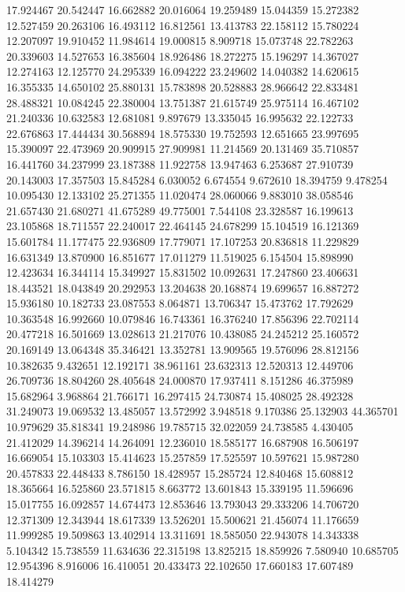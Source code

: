 17.924467
20.542447
16.662882
20.016064
19.259489
15.044359
15.272382
12.527459
20.263106
16.493112
16.812561
13.413783
22.158112
15.780224
12.207097
19.910452
11.984614
19.000815
8.909718
15.073748
22.782263
20.339603
14.527653
16.385604
18.926486
18.272275
15.196297
14.367027
12.274163
12.125770
24.295339
16.094222
23.249602
14.040382
14.620615
16.355335
14.650102
25.880131
15.783898
20.528883
28.966642
22.833481
28.488321
10.084245
22.380004
13.751387
21.615749
25.975114
16.467102
21.240336
10.632583
12.681081
9.897679
13.335045
16.995632
22.122733
22.676863
17.444434
30.568894
18.575330
19.752593
12.651665
23.997695
15.390097
22.473969
20.909915
27.909981
11.214569
20.131469
35.710857
16.441760
34.237999
23.187388
11.922758
13.947463
6.253687
27.910739
20.143003
17.357503
15.845284
6.030052
6.674554
9.672610
18.394759
9.478254
10.095430
12.133102
25.271355
11.020474
28.060066
9.883010
38.058546
21.657430
21.680271
41.675289
49.775001
7.544108
23.328587
16.199613
23.105868
18.711557
22.240017
22.464145
24.678299
15.104519
16.121369
15.601784
11.177475
22.936809
17.779071
17.107253
20.836818
11.229829
16.631349
13.870900
16.851677
17.011279
11.519025
6.154504
15.898990
12.423634
16.344114
15.349927
15.831502
10.092631
17.247860
23.406631
18.443521
18.043849
20.292953
13.204638
20.168874
19.699657
16.887272
15.936180
10.182733
23.087553
8.064871
13.706347
15.473762
17.792629
10.363548
16.992660
10.079846
16.743361
16.376240
17.856396
22.702114
20.477218
16.501669
13.028613
21.217076
10.438085
24.245212
25.160572
20.169149
13.064348
35.346421
13.352781
13.909565
19.576096
28.812156
10.382635
9.432651
12.192171
38.961161
23.632313
12.520313
12.449706
26.709736
18.804260
28.405648
24.000870
17.937411
8.151286
46.375989
15.682964
3.968864
21.766171
16.297415
24.730874
15.408025
28.492328
31.249073
19.069532
13.485057
13.572992
3.948518
9.170386
25.132903
44.365701
10.979629
35.818341
19.248986
19.785715
32.022059
24.738585
4.430405
21.412029
14.396214
14.264091
12.236010
18.585177
16.687908
16.506197
16.669054
15.103303
15.414623
15.257859
17.525597
10.597621
15.987280
20.457833
22.448433
8.786150
18.428957
15.285724
12.840468
15.608812
18.365664
16.525860
23.571815
8.663772
13.601843
15.339195
11.596696
15.017755
16.092857
14.674473
12.853646
13.793043
29.333206
14.706720
12.371309
12.343944
18.617339
13.526201
15.500621
21.456074
11.176659
11.999285
19.509863
13.402914
13.311691
18.585050
22.943078
14.343338
5.104342
15.738559
11.634636
22.315198
13.825215
18.859926
7.580940
10.685705
12.954396
8.916006
16.410051
20.433473
22.102650
17.660183
17.607489
18.414279
